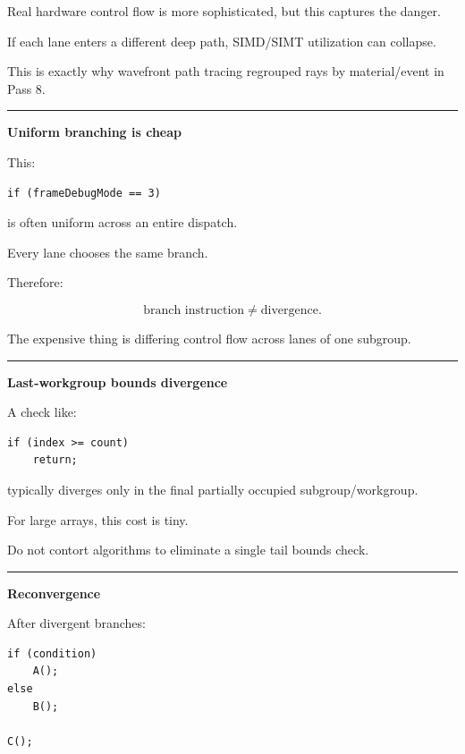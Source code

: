 Real hardware control flow is more sophisticated, but this captures the danger.

If each lane enters a different deep path, SIMD/SIMT utilization can collapse.

This is exactly why wavefront path tracing regrouped rays by material/event in Pass 8.

\begin{center}\rule{0.5\linewidth}{0.5pt}\end{center}

\textbf{Uniform branching is cheap}

This:

\protect{}\label{3mrjt7}%
\begin{verbatim}
if (frameDebugMode == 3)
\end{verbatim}

is often uniform across an entire dispatch.

Every lane chooses the same branch.

Therefore:

\[
\boxed{
\text{branch instruction}
\neq
\text{divergence}.
}
\]

The expensive thing is differing control flow across lanes of one subgroup.

\begin{center}\rule{0.5\linewidth}{0.5pt}\end{center}

\textbf{Last-workgroup bounds divergence}

A check like:

\protect{}\label{jynsrg}%
\begin{verbatim}
if (index >= count)
    return;
\end{verbatim}

typically diverges only in the final partially occupied subgroup/workgroup.

For large arrays, this cost is tiny.

Do not contort algorithms to eliminate a single tail bounds check.

\begin{center}\rule{0.5\linewidth}{0.5pt}\end{center}

\textbf{Reconvergence}

After divergent branches:

\protect{}\label{x2i0x6}%
\begin{verbatim}
if (condition)
    A();
else
    B();

C();
\end{verbatim}

